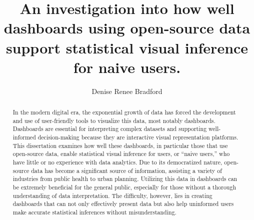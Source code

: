 \documentclass[print]{nuthesis}
\begin{document}
\frontmatter
\title{An investigation into how well dashboards using open-source data support statistical visual inference for naive users.}
\author{Denise Renee Bradford}
\maketitle


\begin{abstract}
    In the modern digital era, the exponential growth of data has forced the development and use of user-friendly tools to visualize this data, most notably dashboards. Dashboards are essential for interpreting complex datasets and supporting well-informed decision-making because they are interactive visual representation platforms. This dissertation examines how well these dashboards, in particular those that use open-source data, enable statistical visual inference for users, or ``naive users,'' who have little or no experience with data analytics.
    Due to its democratized nature, open-source data has become a significant source of information, assisting a variety of industries from public health to urban planning. Utilizing this data in dashboards can be extremely beneficial for the general public, especially for those without a thorough understanding of data interpretation. The difficulty, however, lies in creating dashboards that can not only effectively present data but also help uninformed users make accurate statistical inferences without misunderstanding.
\end{abstract}

\begin{copyrightpage}
\end{copyrightpage}
\end{document}
